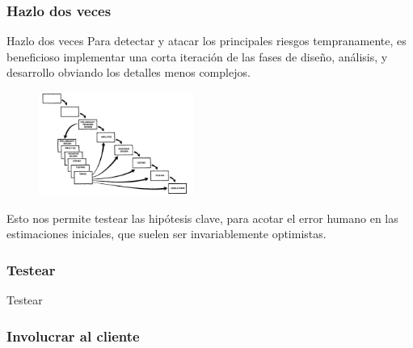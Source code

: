 \documentclass{beamer}
\begin{document}
\subsubsection{Hazlo dos veces}
\begin{frame}{Hazlo dos veces}
Para detectar y atacar los principales riesgos tempranamente, es beneficioso implementar una corta iteración de las fases de diseño, análisis, y desarrollo obviando los detalles menos complejos.

\begin{figure}
\includegraphics[width=0.45\textwidth]{figures/hazloDosVeces.png}
\end{figure}

Esto nos permite testear las hipótesis clave, para acotar el error humano en las estimaciones iniciales, que suelen ser invariablemente optimistas.



\end{frame}

\subsubsection{Testear}

\begin{frame}{Testear}

\end{frame}


\subsubsection{Involucrar al cliente}
\end{document}
